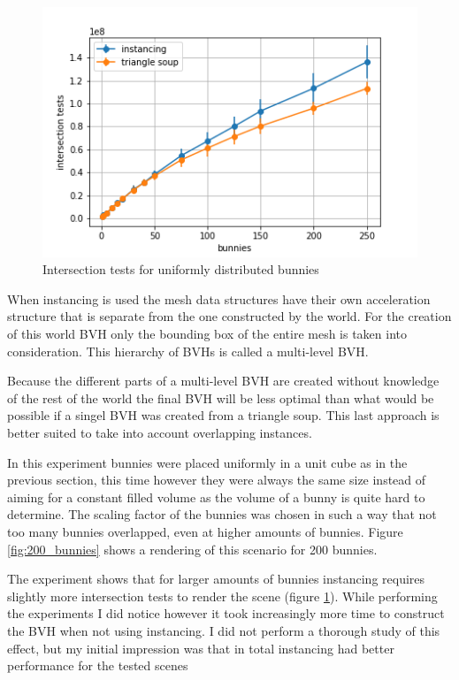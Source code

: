 \documentclass{article}
\begin{document}
\begin{figure}[!htb]
    \centering
    \includegraphics[width=12cm]{plots/instancing_intersection_tests.png}
    \caption{Intersection tests for uniformly distributed bunnies}
    \label{fig:instancing_intersection_tests}
\end{figure}

When instancing is used the mesh data structures have their own acceleration structure that is separate from the one constructed by the world. For the creation of this world BVH only the bounding box of the entire mesh is taken into consideration. This hierarchy of BVHs is called a multi-level BVH.

Because the different parts of a multi-level BVH are created without knowledge of the rest of the world the final BVH will be less optimal than what would be possible if a singel BVH was created from a triangle soup. This last approach is better suited to take into account overlapping instances.

In this experiment bunnies were placed uniformly in a unit cube as in the previous section, this time however they were always the same size instead of aiming for a constant filled volume as the volume of a bunny is quite hard to determine. The scaling factor of the bunnies was chosen in such a way that not too many bunnies overlapped, even at higher amounts of bunnies. Figure \ref{fig:200_bunnies} shows a rendering of this scenario for 200 bunnies.

The experiment shows that for larger amounts of bunnies instancing requires slightly more intersection tests to render the scene (figure \ref{fig:instancing_intersection_tests}). While performing the experiments I did notice however it took increasingly more time to construct the BVH when not using instancing. I did not perform a thorough study of this effect, but my initial impression was that in total instancing had better performance for the tested scenes
\end{document}
